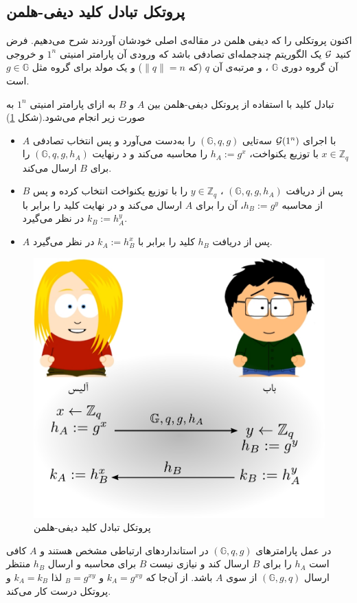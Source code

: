 \subsection*{پروتکل تبادل کلید دیفی-هلمن}
اکنون  پروتکلی را که دیفی هلمن در مقاله‌ی اصلی خودشان
\cite{diffie1976new}
آوردند شرح می‌دهیم. فرض کنید 
${\mathcal G}$
یک الگوریتم چندجمله‌ای تصادفی باشد که ورودی آن پارامتر امنیتی
$1^{n}$
و خروجی آن گروه دوری 
$\mathbb{G}$
، و مرتبه‌ی آن 
$q$
(که
$\parallel q\parallel = n$)
و یک مولد  برای گروه مثل 
$g\in\mathbb{G}$
است. 
\begin{definition}
  تبادل کلید با استفاده از پروتکل دیفی-هلمن بین 
 $A$
 و 
 $B$
به ازای پارامتر امنیتی 
$1^{n}$
 به صورت زیر انجام می‌شود.(شکل 
 \ref{fig:diffie-hellman})
 \begin{itemize}
\item
$A$
با اجرای 
${\mathcal G}(1^{n})$ 
سه‌تایی 
$(\mathbb{G}, q, g)$
را به‌دست  می‌آورد و پس انتخاب تصادفی
$x\in\mathbb{Z}_{q}$
با توزیع یکنواخت، 
$h_{A}:=g^{x}$
را محاسبه می‌کند و د رنهایت 
$(\mathbb{G}, q, g, h_{A})$
را برای 
$B$
ارسال می‌کند.
\item
$B$
پس از دریافت 
$(\mathbb{G}, q, g, h_{A})$
، 
$y\in\mathbb{Z}_{q}$
را با توزیع یکنواخت انتخاب کرده و پس از محاسبه
$h_{B}:=g^{y}$، 
آن را برای 
$A$
ارسال می‌کند و در نهایت کلید را برابر با 
$k_{B}:= h_{A}^{y}$
در نظر می‌گیرد.
\item
$A$
پس از دریافت 
$h_{B}$
 کلید را برابر با 
 $k_{A}:=h_{B}^{x}$
در نظر می‌گیرد. 
 \end{itemize}
\end{definition}

\begin{figure}
\centering
\includegraphics[width=0.5\linewidth]{Images/diffie-hellman}
\caption{پروتکل تبادل کلید دیفی-هلمن}
\label{fig:diffie-hellman}
\end{figure}
در عمل پارامترهای 
$(\mathbb{G}, q, g)$
در استانداردهای ارتباطی مشخص هستند و 
$A$
کافی است 
$h_{A}$
را برای 
$B$
ارسال کند و نیازی نیست 
$B$
برای محاسبه‌ و ارسال 
$h_{B}$
منتظر ارسال 
$(\mathbb{G}, g, q)$
از سوی 
$A$
باشد. از آن‌جا که 
$k_{A} = g^{xy}$
و 
$_{B} = g^{xy}$
لذا 
$k_{A} = k_{B}$
و پروتکل درست کار می‌کند.


